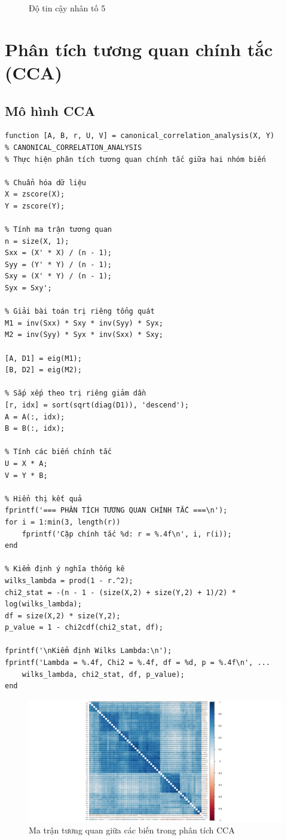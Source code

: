 \begin{figure}[h!]
\begin{minipage}{0.3\textwidth}
        \caption{Độ tin cậy nhân tố 5}
    \end{minipage}
\end{figure}

\section{Phân tích tương quan chính tắc (CCA)}

\subsection{Mô hình CCA}

\begin{matlab}
\begin{lstlisting}
function [A, B, r, U, V] = canonical_correlation_analysis(X, Y)
% CANONICAL_CORRELATION_ANALYSIS
% Thực hiện phân tích tương quan chính tắc giữa hai nhóm biến

% Chuẩn hóa dữ liệu
X = zscore(X);
Y = zscore(Y);

% Tính ma trận tương quan
n = size(X, 1);
Sxx = (X' * X) / (n - 1);
Syy = (Y' * Y) / (n - 1);
Sxy = (X' * Y) / (n - 1);
Syx = Sxy';

% Giải bài toán trị riêng tổng quát
M1 = inv(Sxx) * Sxy * inv(Syy) * Syx;
M2 = inv(Syy) * Syx * inv(Sxx) * Sxy;

[A, D1] = eig(M1);
[B, D2] = eig(M2);

% Sắp xếp theo trị riêng giảm dần
[r, idx] = sort(sqrt(diag(D1)), 'descend');
A = A(:, idx);
B = B(:, idx);

% Tính các biến chính tắc
U = X * A;
V = Y * B;

% Hiển thị kết quả
fprintf('=== PHÂN TÍCH TƯƠNG QUAN CHÍNH TẮC ===\n');
for i = 1:min(3, length(r))
    fprintf('Cặp chính tắc %d: r = %.4f\n', i, r(i));
end

% Kiểm định ý nghĩa thống kê
wilks_lambda = prod(1 - r.^2);
chi2_stat = -(n - 1 - (size(X,2) + size(Y,2) + 1)/2) * log(wilks_lambda);
df = size(X,2) * size(Y,2);
p_value = 1 - chi2cdf(chi2_stat, df);

fprintf('\nKiểm định Wilks Lambda:\n');
fprintf('Lambda = %.4f, Chi2 = %.4f, df = %d, p = %.4f\n', ...
    wilks_lambda, chi2_stat, df, p_value);
end
\end{lstlisting}
\end{matlab}

\begin{figure}[h!]
    \centering
    \includegraphics[width=0.8\linewidth]{../../assets/images/correlation_matrix.png}
    \caption{Ma trận tương quan giữa các biến trong phân tích CCA}
\end{figure}

